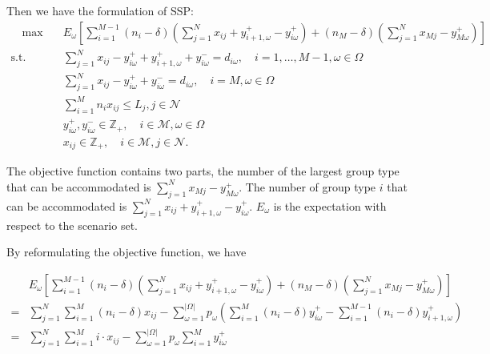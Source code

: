 

Then we have the formulation of SSP:
    \begin{align}
    \quad \max \quad & E_{\omega}\left[\sum_{i=1}^{M-1} (n_i-\delta) (\sum_{j= 1}^{N} x_{ij} + y_{i+1,\omega}^{+} - y_{i \omega}^{+}) + (n_{M}-\delta) (\sum_{j= 1}^{N} x_{Mj} - y_{M \omega}^{+})\right] \\
    \text {s.t.} \quad & \sum_{j= 1}^{N} x_{ij}-y_{i \omega}^{+}+
    y_{i+1, \omega}^{+} + y_{i \omega}^{-}=d_{i \omega}, \quad i = 1,\ldots, M-1, \omega \in \Omega \label{DEF_constr1} \\
    & \sum_{j= 1}^{N} x_{ij} -y_{i \omega}^{+}+y_{i \omega}^{-}=d_{i \omega}, \quad i = M, \omega \in \Omega \label{DEF_constr2}\\
    & \sum_{i=1}^{M} n_{i} x_{ij} \leq L_j, j \in \mathcal{N}  \label{DEF_constr3} \\
    & y_{i \omega}^{+}, y_{i \omega}^{-} \in \mathbb{Z}_{+}, \quad i \in \mathcal{M}, \omega \in \Omega \\
    & x_{ij} \in \mathbb{Z}_{+}, \quad i \in \mathcal{M}, j \in \mathcal{N}.
    \end{align}

The objective function contains two parts, the number of the largest group type that can be accommodated is $\sum_{j= 1}^{N} x_{Mj} - y_{M \omega}^{+}$. The number of group type $i$ that can be accommodated is $\sum_{j= 1}^{N} x_{ij} + y_{i+1,\omega}^{+} - y_{i \omega}^{+}$. $E_{\omega}$ is the expectation with respect to the scenario set.

By reformulating the objective function, we have

\begin{align*}
  & E_{\omega}\left[\sum_{i=1}^{M-1} (n_i-\delta) (\sum_{j= 1}^{N} x_{ij} + y_{i+1,\omega}^{+} - y_{i \omega}^{+}) + (n_M-\delta) (\sum_{j= 1}^{N} x_{Mj} - y_{M \omega}^{+})\right] \\
  =& \sum_{j =1}^{N} \sum_{i=1}^M (n_i- \delta) x_{ij} - \sum_{\omega =1}^{|\Omega|} p_{\omega} \left(\sum_{i=1}^{M}(n_i- \delta)y_{i \omega}^{+} - \sum_{i=1}^{M-1}(n_i-\delta)y_{i+1, \omega}^{+}\right) \\
  =& \sum_{j =1}^{N} \sum_{i=1}^M i \cdot x_{ij} - \sum_{\omega =1}^{|\Omega|} p_{\omega} \sum_{i = 1}^{M} y_{i \omega}^{+}
\end{align*}

